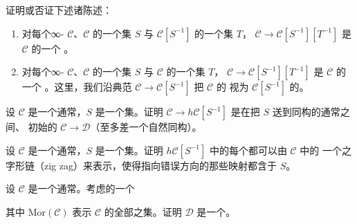\begin{exercise}\label{ex:iterated-localization}
证明或否证下述诸陈述：
\begin{enumerate}[label=(\arabic*)]
  \item 对每个∞-\trCategory{} $\mathcal{C}$、$\mathcal{C}$ 的一个\trMorphism{}集 $S$
        与 $\mathcal{C}[S^{-1}]$ 的一个\trMorphism{}集 $T$，\trFunctor{}%
        $\mathcal{C} \to \mathcal{C}[S^{-1}][T^{-1}]$ 是 $\mathcal{C}$ 的一个%
        \trLocalization{}。
  \item 对每个∞-\trCategory{} $\mathcal{C}$、$\mathcal{C}$ 的一个\trMorphism{}集 $S$
        与 $\mathcal{C}$ 的一个\trMorphism{}集 $T$，\trFunctor{}%
        $\mathcal{C} \to \mathcal{C}[S^{-1}][T^{-1}]$ 是 $\mathcal{C}$ 的一个%
        \trLocalization{}。这里，我们沿典范\trFunctor{}%
        $\mathcal{C} \to \mathcal{C}[S^{-1}]$ 把 $\mathcal{C}$ 的\trMorphism{}%
        视为 $\mathcal{C}[S^{-1}]$ 的\trMorphism{}。
\end{enumerate}
\end{exercise}

\begin{exercise}\label{ex:initial-localization-ordinary}
设 $\mathcal{C}$ 是一个通常\trCategory{}，$S$ 是一个\trMorphism{}集。证明
$\mathcal{C} \to h\mathcal{C}[S^{-1}]$ 是在把 $S$ 送到同构的通常\trCategories{}之间、
初始的\trFunctor{} $\mathcal{C} \to \mathcal{D}$（至多差一个自然同构）。
\end{exercise}

\begin{exercise}\label{ex:zigzag-calculus-of-fractions}
设 $\mathcal{C}$ 是一个通常\trCategory{}，$S$ 是一个\trMorphism{}集。证明
$h\mathcal{C}[S^{-1}]$ 中的每个\trMorphism{}都可以由 $\mathcal{C}$ 中\trMorphism{}的
一个之字形链（zig zag）来表示，使得指向错误方向的那些映射都含于 $S$。
\end{exercise}

\begin{exercise}\label{ex:pushout-groupoid}
设 $\mathcal{C}$ 是一个通常\trCategory{}。考虑\trCategories{}的一个\trPushout{}%
\begin{center}
\end{center}
其中 $\mathrm{Mor}(\mathcal{C})$ 表示 $\mathcal{C}$ 的全部\trMorphism{}之集。证明
$\mathcal{D}$ 是一个\trGroupoid{}。
\end{exercise}

